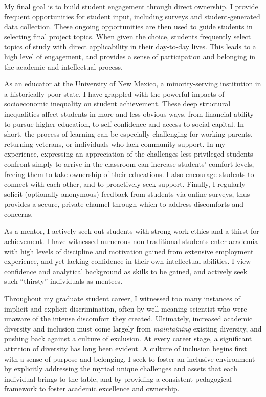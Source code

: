 \documentclass[12pt]{article}
\begin{document}
My final goal is to build student engagement through direct
ownership. I provide frequent opportunities
for student input, including surveys and student-generated 
data collection. These ongoing opportunities are then 
used to guide students in selecting final project topics.
When given the choice, students frequently select topics 
of study with direct applicability in their day-to-day lives. 
This leads to a high level of engagement, and provides
a sense of participation and belonging in the academic
and intellectual process.

As an educator at the University of New Mexico, a 
minority-serving institution in
a historically poor state, I have grappled with the powerful
impacts of socioeconomic inequality on student achievement. 
These deep structural inequalities affect students in more 
and less obvious ways, from financial ability to pursue higher 
education, to self-confidence and access to social capital.
In short, the process of learning can be especially challenging
for working parents, returning veterans, or individuals who
lack community support. In my experience, expressing an 
appreciation of the challenges less privileged students confront
simply to arrive in the classroom can increase students'
comfort levels, freeing them to take ownership of their educations.
I also encourage students to connect with each other,
and to proactively seek support. Finally, I 
regularly solicit (optionally anonymous) feedback 
from students via online surveys, thus provides a 
secure, private channel through which to address discomforts 
and concerns.

As a mentor, I actively seek out students with strong work 
ethics and a thirst for achievement. I have witnessed numerous 
non-traditional students enter academia with high levels 
of discipline and motivation gained from extensive
employment experience, and yet lacking confidence in 
their own intellectual abilities. I view confidence 
and analytical background as skills to be gained, and
actively seek such ``thirsty'' individuals as mentees.

Throughout my graduate student career, 
I witnessed too many instances of implicit and explicit 
discrimination, often by well-meaning scientist who were 
unaware of the intense discomfort they created. 
Ultimately, increased academic diversity and inclusion must 
come largely from {\em maintaining} existing diversity, and 
pushing back against a culture of exclusion. At every career 
stage, a significant attrition of diversity has long been 
evident. A culture of inclusion begins first with a sense of 
purpose and belonging. I seek to foster an inclusive 
environment by explicitly addressing the myriad unique 
challenges and assets that each individual brings to the 
table, and by providing a consistent pedagogical framework 
to foster academic excellence and ownership.
\end{document}
